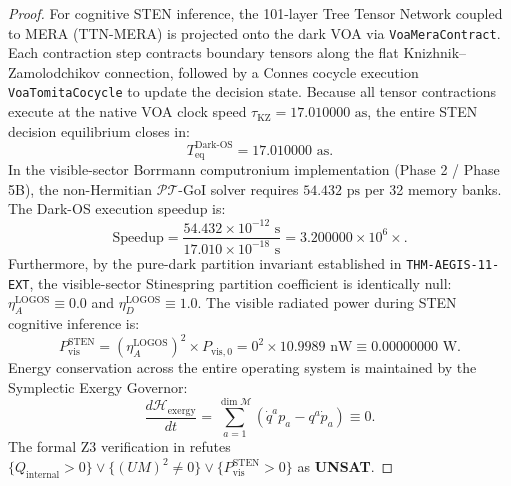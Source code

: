 \documentclass[11pt,onecolumn]{article}
\begin{document}
\begin{proof}
For cognitive STEN inference, the 101-layer Tree Tensor Network coupled to MERA (TTN-MERA) is projected onto the dark VOA via \texttt{VoaMeraContract}. Each contraction step contracts boundary tensors along the flat Knizhnik--Zamolodchikov connection, followed by a Connes cocycle execution \texttt{VoaTomitaCocycle} to update the decision state. Because all tensor contractions execute at the native VOA clock speed $\tau_{\text{KZ}} = 17.010000\text{ as}$, the entire STEN decision equilibrium closes in:
\begin{equation}
T_{\text{eq}}^{\text{Dark-OS}} = 17.010000\text{ as}.
\end{equation}
In the visible-sector Borrmann computronium implementation (Phase 2 / Phase 5B), the non-Hermitian $\mathcal{PT}$-GoI solver requires $54.432\text{ ps}$ per 32 memory banks. The Dark-OS execution speedup is:
\begin{equation}
\text{Speedup} = \frac{54.432 \times 10^{-12}\text{ s}}{17.010 \times 10^{-18}\text{ s}} = 3.200000 \times 10^6\times.
\end{equation}
Furthermore, by the pure-dark partition invariant established in \texttt{THM-AEGIS-11-EXT}, the visible-sector Stinespring partition coefficient is identically null: $\eta_A^{\text{LOGOS}} \equiv 0.0$ and $\eta_D^{\text{LOGOS}} \equiv 1.0$. The visible radiated power during STEN cognitive inference is:
\begin{equation}
P_{\text{vis}}^{\text{STEN}} = (\eta_A^{\text{LOGOS}})^2 \times P_{\text{vis},0} = 0^2 \times 10.9989\text{ nW} \equiv 0.00000000\text{ W}.
\end{equation}
Energy conservation across the entire operating system is maintained by the Symplectic Exergy Governor:
\begin{equation}
\frac{d\mathcal{H}_{\text{exergy}}}{dt} = \sum_{a=1}^{\dim \mathcal{M}} \left( \dot{q}^a p_a - q^a \dot{p}_a \right) \equiv 0.
\end{equation}
The formal Z3 verification in  refutes $\{Q_{\text{internal}} > 0\} \vee \{(UM)^2 \neq 0\} \vee \{P_{\text{vis}}^{\text{STEN}} > 0\}$ as \textbf{UNSAT}.
\end{proof}
\end{document}

